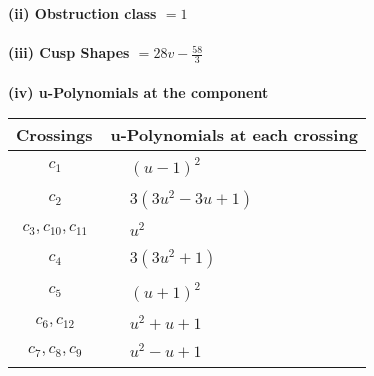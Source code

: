\documentclass[1p]{elsarticle_modified}
\theoremstyle{definition}
\begin{document}
\flushleft \textbf{(ii) Obstruction class $= 1$}\\~\\
\flushleft \textbf{(iii) Cusp Shapes $= 28 v-\frac{58}{3}$}\\~\\
\newpage\renewcommand{\arraystretch}{1}
\flushleft \textbf{(iv) u-Polynomials at the component}\newline \\
\begin{tabular}{m{50pt}|m{274pt}}
Crossings & \hspace{64pt}u-Polynomials at each crossing \\
\hline $$\begin{aligned}c_{1}\end{aligned}$$&$\begin{aligned}
&(u-1)^2
\end{aligned}$\\
\hline $$\begin{aligned}c_{2}\end{aligned}$$&$\begin{aligned}
&3(3 u^2-3 u+1)
\end{aligned}$\\
\hline $$\begin{aligned}c_{3},c_{10},c_{11}\end{aligned}$$&$\begin{aligned}
&u^2
\end{aligned}$\\
\hline $$\begin{aligned}c_{4}\end{aligned}$$&$\begin{aligned}
&3(3 u^2+1)
\end{aligned}$\\
\hline $$\begin{aligned}c_{5}\end{aligned}$$&$\begin{aligned}
&(u+1)^2
\end{aligned}$\\
\hline $$\begin{aligned}c_{6},c_{12}\end{aligned}$$&$\begin{aligned}
&u^2+u+1
\end{aligned}$\\
\hline $$\begin{aligned}c_{7},c_{8},c_{9}\end{aligned}$$&$\begin{aligned}
&u^2- u+1
\end{aligned}$\\
\hline
\end{tabular}\\~\\
\end{document}
